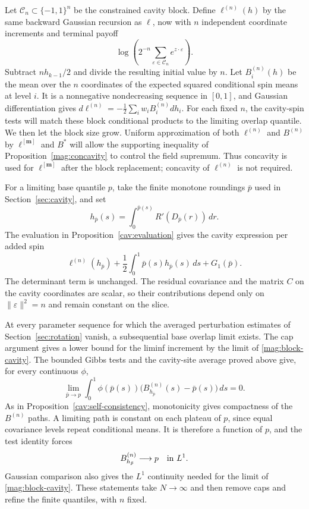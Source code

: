 Let $\mathcal C_n\subset\{-1,1\}^n$ be the constrained cavity block.
Define $\ell^{(n)}(h)$ by the same backward Gaussian recursion as $\ell$,
now with $n$ independent coordinate increments and terminal payoff
\[
 \log\left(2^{-n}\sum_{\varepsilon\in\mathcal C_n}
                       e^{z\cdot\varepsilon}\right).
\]
Subtract $nh_{k-1}/2$ and divide the resulting initial value by $n$.
Let $B_i^{(n)}(h)$ be the mean over the $n$ coordinates of the expected
squared conditional spin means at level $i$. It is a nonnegative
nondecreasing sequence in $[0,1]$, and Gaussian differentiation gives
$d\ell^{(n)}=-\tfrac12\sum_iw_iB_i^{(n)}dh_i$.
For each fixed $n$, the cavity-spin tests will match these block
conditional products to the limiting overlap quantile. We then let the
block size grow. Uniform approximation of both $\ell^{(n)}$ and
$B^{(n)}$ by $\ell^{[\mathbf m]}$ and $B^*$ will allow the supporting
inequality of Proposition~\ref{mag:concavity} to control the field
supremum. Thus concavity is used for $\ell^{[\mathbf m]}$ after the
block replacement; concavity of $\ell^{(n)}$ is not required.

For a limiting base quantile $p$, take the finite monotone roundings
$\bar p$ used in Section~\ref{sec:cavity}, and set
\begin{equation}\label{mag:hp}
 h_{\bar p}(s)=\int_0^{\bar p(s)}R'(D_{\bar p}(r))\,dr.
\end{equation}
The evaluation in Proposition~\ref{cav:evaluation} gives the cavity
expression per added spin
\begin{equation}\label{mag:block-cavity}
 \ell^{(n)}(h_{\bar p})
       +\frac12\int_0^1\bar p(s)h_{\bar p}(s)\,ds+G_1(\bar p).
\end{equation}
The determinant term is unchanged. The residual covariance and the
matrix $C$ on the cavity coordinates are scalar, so their contributions
depend only on $\|\varepsilon\|^2=n$ and remain constant on the slice.

At every parameter sequence for which the averaged perturbation
estimates of Section~\ref{sec:rotation} vanish, a subsequential base
overlap limit exists. The cap argument gives a lower bound for the
liminf increment by the limit of \eqref{mag:block-cavity}. The bounded
Gibbs tests and the cavity-site average proved above give, for every
continuous $\phi$,
\[
 \lim_{\bar p\to p}\int_0^1\phi(\bar p(s))
       \bigl(B^{(n)}_{h_{\bar p}}(s)-\bar p(s)\bigr)\,ds=0.
\]
As in Proposition~\ref{cav:self-consistency}, monotonicity gives compactness
of the $B^{(n)}$ paths. A limiting path is constant on each plateau of
$p$, since equal covariance levels repeat conditional means. It is
therefore a function of $p$, and the test identity forces
\begin{equation}\label{mag:block-consistency}
 B^{(n)}_{h_{\bar p}}\longrightarrow p\quad\hbox{in }L^1.
\end{equation}
Gaussian comparison also gives the $L^1$ continuity needed for the limit
of \eqref{mag:block-cavity}. These statements take $N\to\infty$ and then
remove caps and refine the finite quantiles, with $n$ fixed.

